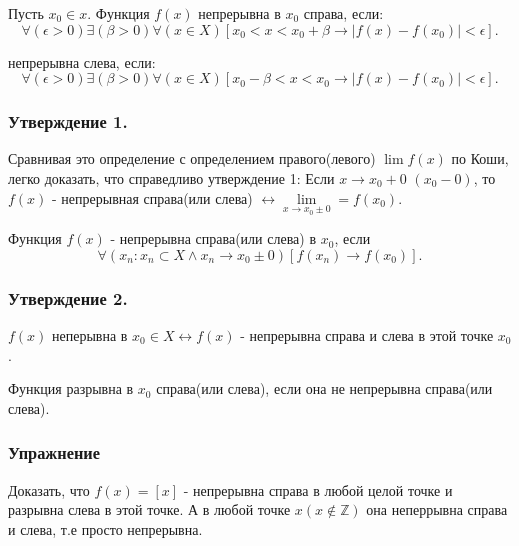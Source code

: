 \opred
	Пусть $x_0 \in x$. Функция  $f(x)$ непрерывна в $x_0$ справа, если: $$\forall(\epsilon>0)\exists(\beta>0)\forall(x \in X)[x_0 < x < x_0+\beta\rightarrow |f(x)-f(x_0)| < \epsilon].$$

	непрерывна слева, если:  $$\forall(\epsilon>0)\exists(\beta>0)\forall(x \in X)[x_0 - \beta < x < x_0\rightarrow |f(x)-f(x_0)| < \epsilon].$$

\subsubsection{Утверждение 1.}
	Сравнивая это определение с определением правого(левого) $\lim f(x)$ по Коши, легко доказать, что справедливо утверждение 1:
	Если $x\rightarrow x_0 + 0$ $(x_0-0)$, то $f(x)$ - непрерывная справа(или слева) $\leftrightarrow\lim\limits_{x\rightarrow x_0\pm0}=f(x_0)$.

\opred	
	Функция $f(x)$ - непрерывна справа(или слева) в $x_0$, если $$\forall({x_n}:x_n\subset X\wedge x_n \rightarrow x_0 \pm0 )[f(x_n)\rightarrow f(x_0)].$$
	
\subsubsection{Утверждение 2.}$f(x)$ неперывна в $x_0 \in X \leftrightarrow f(x)$ - непрерывна справа и слева в этой точке $x_0$.

\opred	
	Функция разрывна в $x_0$ справа(или слева), если она не непрерывна справа(или слева).
	
\subsubsection{Упражнение} Доказать, что $f(x) = [x]$ - непрерывна справа в любой целой точке и разрывна слева в этой точке. А в любой точке  $x (x\notin \mathbb {Z})$ она неперрывна справа и слева, т.е просто непрерывна.
